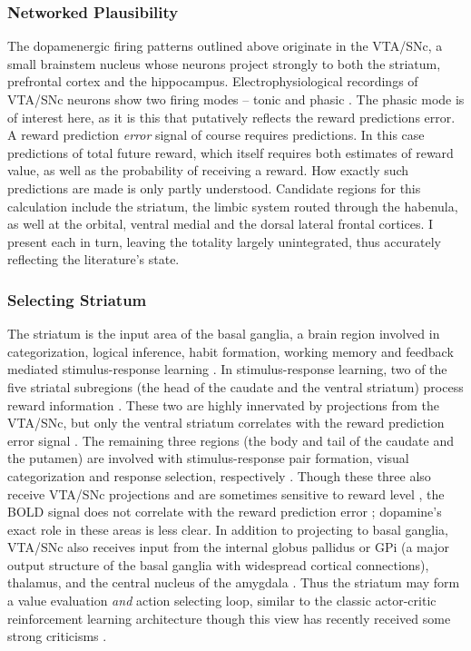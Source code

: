\documentclass[doc,12pt]{apa}        %
\begin{document}
\subsubsection{Networked Plausibility}
\label{sub:net_plaus}
The dopamenergic firing patterns outlined above originate in the VTA/SNc, a small brainstem nucleus whose neurons project strongly to both the striatum, prefrontal cortex and the hippocampus.  Electrophysiological recordings of VTA/SNc neurons show two firing modes -- tonic and phasic \cite{DawNW:2006p6343}.  The phasic mode is of interest here, as it is this that putatively reflects the reward predictions error. A reward prediction \emph{error} signal of course requires predictions.  In this case predictions of total future reward, which itself requires both estimates of reward value, as well as the probability of receiving a reward.  How exactly such predictions are made is only partly understood.  Candidate regions for this calculation include the striatum, the limbic system routed through the habenula, as well at the orbital, ventral medial and the dorsal lateral frontal cortices.  I present each in turn, leaving the totality largely unintegrated, thus accurately reflecting the literature's state.

\subsubsection{Selecting Striatum}
\label{sub:sel_str}
The striatum is the input area of the basal ganglia, a brain region involved in categorization, logical inference, habit formation, working memory and feedback mediated stimulus-response learning \cite{Frank:2001p1996,Jin:2010p7199,SchmitzerTorbert:2004p5410,Seger:2008p6401,Seger:2010p7189,Yin:2006p5080}.  In stimulus-response learning, two of the five striatal subregions (the head of the caudate and the ventral striatum) process reward information \cite{Yin:2005p5101,Yin:2008p6347,Schonberg:2009p6669}.  These two are highly innervated by projections from the VTA/SNc, but only the ventral striatum correlates with the reward prediction error signal \cite{Haruno:2006p3979,Seger:2010p7189}.  The remaining three regions (the body and tail of the caudate and the putamen) are involved with stimulus-response pair formation, visual categorization and response selection, respectively \cite{Seger:2008p6401,Seger:2010p7189}.  Though these three also receive VTA/SNc projections and are sometimes sensitive to reward level \cite{BischoffGrethe:2009p4570}, the BOLD signal does not correlate with the reward prediction error \cite{Seger:2010p7189}; dopamine's exact role in these areas is less clear.  In addition to projecting to basal ganglia, VTA/SNc also receives input from the internal globus pallidus or GPi (a major output structure of the basal ganglia with widespread cortical connections), thalamus, and the central nucleus of the amygdala \cite{Botvinick:2008p6594}.   Thus the striatum may form a value evaluation \emph{and} action selecting loop, similar to the classic actor-critic reinforcement learning architecture \cite{Bornstein:2011p7996,Ito:2011p8146} though this view has recently received some strong criticisms \cite{Joel:2002p6593}.
\end{document}

